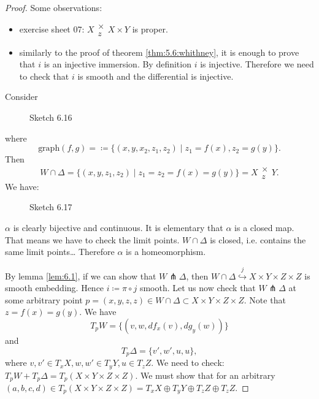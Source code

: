 \begin{proof}
    Some observations:
    \begin{itemize}
        \item exercise sheet 07: \(X\substack{\times\\z}X\times Y\) is proper.
        \item similarly to the proof of theorem \ref{thm:5.6:whithney}, it is enough to prove that 
              \(i\) is an injective immersion. By definition \(i\) is injective. Therefore we need to check that \(i\) is smooth and the differential is injective.
    \end{itemize}

    Consider 
    \begin{figure}[H]\label{fig:6.16}
        \centering
        \caption{Sketch 6.16}
    \end{figure}        
    where \[\text{graph}(f,g)=\coloneqq \{(x,y,x_2,z_1,z_2)\mid z_1=f(x),z_2=g(y)\}.\]
    Then \[W\cap \Delta=\{(x,y,z_1,z_2)\mid z_1=z_2=f(x)=g(y)\}=X\substack{\times\\z}Y.\]
    We have:
    \begin{figure}[H]\label{fig:6.17}
        \centering
        \caption{Sketch 6.17}
    \end{figure} 
    \(\alpha\) is clearly bijective and continuous. It is elementary that \(\alpha\) is a closed map.
    That means we have to check the limit points. \(W\cap \Delta\) is closed, i.e. contains the same limit points\dots   
    Therefore \(\alpha\) is a homeomorphism.

    By lemma \ref{lem:6.1}, if we can show that \(W\pitchfork \Delta\), then \(W\cap \Delta\stackrel{j}{\hookrightarrow}X\times Y\times Z\times Z\) is smooth embedding. 
    Hence \(i\coloneqq \pi\circ j\) smooth. Let us now check that \(W\pitchfork \Delta\) at some arbitrary point \(p=(x,y,z,z)\in W\cap \Delta\subset X\times Y\times Z\times Z\).
    Note that \(z=f(x)=g(y)\). We have \[T_pW=\{(v,w,df_x(v),dg_y(w))\}\]
    and 
    \[T_p\Delta=\{v',w',u,u\},\]
    where \(v,v'\in T_xX,w,w'\in T_yY,u\in T_zZ.\)
    We need to check: \(T_p W+T_p\Delta=T_p(X\times Y\times Z\times Z)\). 
    We must show that for an arbitrary \((a,b,c,d)\in T_p(X\times Y\times Z\times Z)=T_xX\oplus T_yY\oplus T_zZ \oplus T_zZ.\)


\end{proof}
